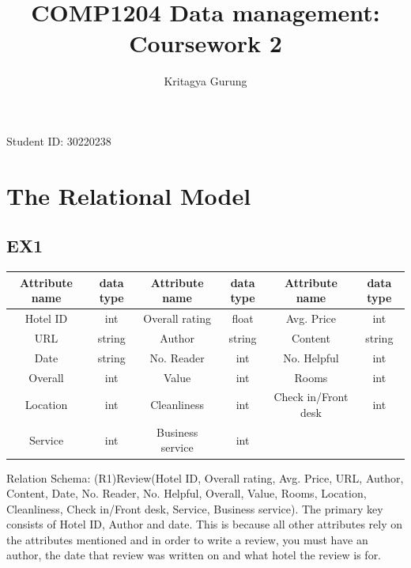 \documentclass{article}
\title{COMP1204 Data management: Coursework 2}
\author{Kritagya Gurung}
\begin{document}
	
	\maketitle
	\begin{center}
		Student ID: 30220238
	\end{center}
	
	\newpage

	\section{The Relational Model}

	\subsection{EX1}
	
	\begin{center}
		\begin{tabular}{||c c | c c | c c ||} 
			\hline
			Attribute name & data type & Attribute name & data type & Attribute name & data type \\
			\hline
			Hotel ID & int & Overall rating & float & Avg. Price & int \\ 
			URL & string & Author & string & Content & string \\ 
			Date & string & No. Reader & int & No. Helpful & int \\ 
			Overall & int & Value & int & Rooms & int \\
			Location & int & Cleanliness & int & Check in/Front desk & int \\
			Service & int & Business service & int &  &  \\
			\hline
		\end{tabular}
	\end{center}
	Relation Schema: 
	\newline
	(R1)Review(Hotel ID, Overall rating, Avg. Price, URL, Author, Content, Date, No. Reader, No. Helpful, Overall, Value, Rooms, Location, Cleanliness, Check in/Front desk, Service, Business service).
	\newline
	The primary key consists of Hotel ID, Author and date. This is because all other attributes rely on the attributes mentioned and in order to write a review, you must have an author, the date that review was written on and what hotel the review is for.
		
\end{document}
